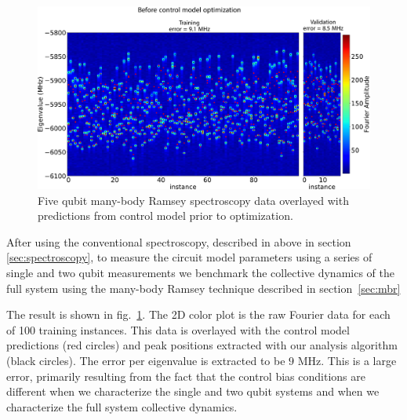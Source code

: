 \begin{figure}[h]
    \begin{center}
        \includegraphics[width=150 mm]{./PDF/fourier_amp_2d_tv_pre.pdf}
    \end{center}
        \caption{
        Five qubit many-body Ramsey spectroscopy data overlayed with predictions from control model prior to optimization.
        }
    \label{mbr_benchmark_pre_optimization}
\end{figure}
After using the conventional spectroscopy, described in above in section \ref{sec:spectroscopy}, to measure the circuit model parameters
using a series of single and two qubit measurements we benchmark the collective dynamics of the full system using the many-body Ramsey technique
described in section~\ref{sec:mbr}

The result is shown in fig.~\ref{mbr_benchmark_pre_optimization}.
The 2D color plot is the raw Fourier data for each of 100 training instances.
This data is overlayed with the control model predictions (red circles) and peak positions extracted with our analysis algorithm (black circles).
The error per eigenvalue is extracted to be $9$ MHz.
This is a large error, primarily resulting from the fact that the control bias conditions are different when we characterize
the single and two qubit systems and when we characterize the full system collective dynamics.


